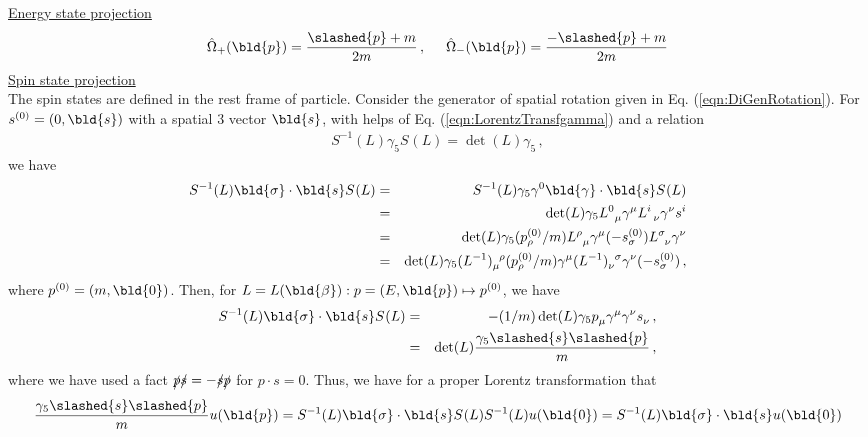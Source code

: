 \underline{Energy state projection}
\begin{eqnarray}
\hat{\Omega}_+(\bld{p})
=
\frac{\slashed{p} + m}{2m}
\,, \hspace{5mm}
\hat{\Omega}_-(\bld{p})
=
\frac{- \slashed{p} + m}{2m}
\end{eqnarray}
\underline{Spin state projection}\\
The spin states are defined in the rest frame of particle.
Consider the generator of spatial rotation given in Eq. (\ref{eqn:DiGenRotation}).
For $s^{(0)}= (0, \bld{s})$ with a spatial 3 vector $\bld{s}$, 
with helps of Eq. (\ref{eqn:LorentzTransfgamma}) and a relation
\begin{eqnarray}
S^{-1}(L) \gamma_5 S^{}(L) = \det (L) \gamma_5\,,
\end{eqnarray}
we have 
\begin{eqnarray}
S^{-1}(L) \bld{\sigma} \cdot \bld{s} S^{}(L) 
&=&
S^{-1}(L) \gamma_5 \gamma^0 \bld{\gamma} \cdot \bld{s} S^{}(L) 
\nonumber\\
&=&
\det (L) \gamma_5 L^0_{\;\;\mu} \gamma^\mu L^{i}_{\;\;\nu} \gamma^\nu s^i
\nonumber\\
&=&
\det (L) \gamma_5 (p^{(0)}_\rho / m) L^\rho_{\;\;\mu} \gamma^\mu (- s^{(0)}_\sigma) L^{\sigma}_{\;\;\nu} \gamma^\nu 
\nonumber\\
&=&
\det (L) \gamma_5  (L^{-1})^{\;\;\rho}_{\mu} (p^{(0)}_\rho / m) \gamma^\mu  
(L^{-1})^{\;\;\sigma}_{\nu} \gamma^\nu (- s^{(0)}_\sigma)\,,
\nonumber
\end{eqnarray}
where $p^{(0)}= (m, \bld{0})$.
Then, for $L= L(\bld{\beta}): p = (E, \bld{p}) \mapsto p^{(0)}$,
we have
\begin{eqnarray}
S^{-1}(L) \bld{\sigma} \cdot \bld{s} S^{}(L) 
&=&
- (1/m) \det (L) \gamma_5  p^{}_\mu  \gamma^\mu   \gamma^\nu  s^{}_\nu\,,
\nonumber\\
&=&
\det (L) \frac{\gamma_5 \slashed{s} \slashed{p}}{m}\,,
\end{eqnarray}
where we have used a fact $\slashed{p} \slashed{s} = - \slashed{s} \slashed{p} $
for $p\cdot s = 0$.
Thus, we have for a proper Lorentz transformation that
\begin{eqnarray}
\frac{\gamma_5 \slashed{s} \slashed{p}}{m}
u(\bld{p})
=
S^{-1}(L) \bld{\sigma} \cdot \bld{s} S^{}(L) S^{-1}(L) u(\bld{0})
=
S^{-1}(L) \bld{\sigma} \cdot \bld{s} u(\bld{0})
\end{eqnarray}
